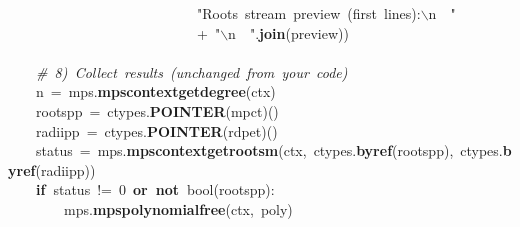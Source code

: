 \documentclass{article}\usepackage[]{graphicx}\usepackage[dvipsnames,table]{xcolor}
\makeatletter
\newcommand{\hlnum}[1]{\textcolor[rgb]{0.686,0.059,0.569}{#1}}%
\newcommand{\hlsng}[1]{\textcolor[rgb]{0.192,0.494,0.8}{#1}}%
\newcommand{\hlcom}[1]{\textcolor[rgb]{0.678,0.584,0.686}{\textit{#1}}}%
\newcommand{\hlopt}[1]{\textcolor[rgb]{0,0,0}{#1}}%
\newcommand{\hldef}[1]{\textcolor[rgb]{0.345,0.345,0.345}{#1}}%
\newcommand{\hlkwa}[1]{\textcolor[rgb]{0.161,0.373,0.58}{\textbf{#1}}}%
\newcommand{\hlkwb}[1]{\textcolor[rgb]{0.69,0.353,0.396}{#1}}%
\newcommand{\hlkwd}[1]{\textcolor[rgb]{0.737,0.353,0.396}{\textbf{#1}}}%
\newenvironment{kframe}{%
 \def\at@end@of@kframe{}%
 \ifinner\ifhmode%
  \def\at@end@of@kframe{\end{minipage}}%
  \begin{minipage}{\columnwidth}%
 \fi\fi%
 \def\FrameCommand##1{\hskip\@totalleftmargin \hskip-\fboxsep
 \colorbox{shadecolor}{##1}\hskip-\fboxsep
     \hskip-\linewidth \hskip-\@totalleftmargin \hskip\columnwidth}%
 \MakeFramed {\advance\hsize-\width
   \@totalleftmargin\z@ \linewidth\hsize
   \@setminipage}}%
 {\par\unskip\endMakeFramed%
 \at@end@of@kframe}
\newenvironment{knitrout}{}{} %
\let\hlesc\hldef \let\hlpps\hldef \let\hllin\hldef \let\hlslc\hlcom \let\hlppc\hlcom
\makeatother
\begin{document}
\begin{center}
\begin{minipage}[m]{18cm}
\begin{knitrout}
\begin{kframe}
\hldef{}\hldef{\ \ \ \ \ \ \ \ \ \ \ \ \ \ \ \ \ \ \ \ \ \ \ \ \ \ \ }\hldef{}\hlsng{"Roots\ stream\ preview\ (first\ lines):}\hlesc{$\backslash$n}\hldef{\ \ }\hlesc{}\hlsng{"}\hldef{}\hspace*{\fill}\\
\hldef{}\hldef{\ \ \ \ \ \ \ \ \ \ \ \ \ \ \ \ \ \ \ \ \ \ \ \ \ \ \ }\hldef{}\hlopt{+\ }\hldef{}\hlsng{"}\hlesc{$\backslash$n}\hldef{\ \ }\hlesc{}\hlsng{"}\hldef{}\hlopt{.}\hldef{}\hlkwd{join}\hldef{}\hlopt{(}\hldef{preview}\hlopt{))}\hspace*{\fill}\\
\hldef{}\hspace*{\fill}\\
\hldef{}\hldef{\ \ \ \ }\hldef{}\hlslc{\#\ 8)\ Collect\ results\ (unchanged\ from\ your\ code)}\hspace*{\fill}\\
\hldef{}\hldef{\ \ \ \ }\hldef{n\ }\hlopt{=\ }\hldef{\textunderscore mps}\hlopt{.}\hldef{}\hlkwd{mps\textunderscore context\textunderscore get\textunderscore degree}\hldef{}\hlopt{(}\hldef{ctx}\hlopt{)}\hspace*{\fill}\\
\hldef{}\hldef{\ \ \ \ }\hldef{roots\textunderscore pp\ }\hlopt{=\ }\hldef{ctypes}\hlopt{.}\hldef{}\hlkwd{POINTER}\hldef{}\hlopt{(}\hldef{mpc\textunderscore t}\hlopt{)()}\hspace*{\fill}\\
\hldef{}\hldef{\ \ \ \ }\hldef{radii\textunderscore pp\ }\hlopt{=\ }\hldef{ctypes}\hlopt{.}\hldef{}\hlkwd{POINTER}\hldef{}\hlopt{(}\hldef{rdpe\textunderscore t}\hlopt{)()}\hspace*{\fill}\\
\hldef{}\hldef{\ \ \ \ }\hldef{status\ }\hlopt{=\ }\hldef{\textunderscore mps}\hlopt{.}\hldef{}\hlkwd{mps\textunderscore context\textunderscore get\textunderscore roots\textunderscore m}\hldef{}\hlopt{(}\hldef{ctx}\hlopt{,\ }\hldef{ctypes}\hlopt{.}\hldef{}\hlkwd{byref}\hldef{}\hlopt{(}\hldef{roots\textunderscore pp}\hlopt{),\ }\hldef{ctypes}\hlopt{.}\hldef{}\hlkwd{byref}\hldef{}\hlopt{(}\hldef{radii\textunderscore pp}\hlopt{))}\hspace*{\fill}\\
\hldef{}\hldef{\ \ \ \ }\hldef{}\hlkwa{if\ }\hldef{status\ }\hlopt{!=\ }\hldef{}\hlnum{0\ }\hldef{}\hlkwa{or\ not\ }\hldef{}\hlkwb{bool}\hldef{}\hlopt{(}\hldef{roots\textunderscore pp}\hlopt{):}\hspace*{\fill}\\
\hldef{}\hldef{\ \ \ \ \ \ \ \ }\hldef{\textunderscore mps}\hlopt{.}\hldef{}\hlkwd{mps\textunderscore polynomial\textunderscore free}\hldef{}\hlopt{(}\hldef{ctx}\hlopt{,\ }\hldef{poly}\hlopt{)}\hspace*{\fill}\\

\end{kframe}
\end{knitrout}
\end{minipage}
\end{center}
\end{document}
